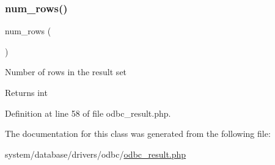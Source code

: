 \subsubsection{\texorpdfstring{num\_rows()}{num\_rows()}}
{\footnotesize\ttfamily num\+\_\+rows (\begin{DoxyParamCaption}{ }\end{DoxyParamCaption})}

Number of rows in the result set

\begin{DoxyReturn}{Returns}
int 
\end{DoxyReturn}


Definition at line 58 of file odbc\+\_\+result.\+php.



The documentation for this class was generated from the following file\+:\begin{DoxyCompactItemize}
\item 
system/database/drivers/odbc/\mbox{\hyperlink{odbc__result_8php}{odbc\+\_\+result.\+php}}\end{DoxyCompactItemize}
